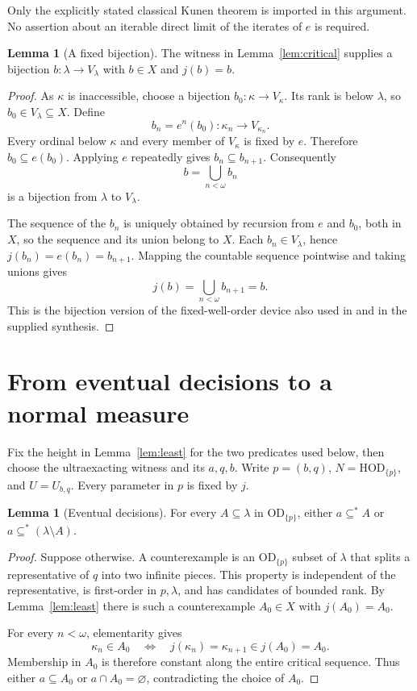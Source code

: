 \documentclass[11pt,letterpaper]{article}
\theoremstyle{definition}
\newtheorem{lemma}[definition]{Lemma}
\numberwithin{equation}{section}
\newcommand{\HOD}{\mathrm{HOD}}
\newcommand{\OD}{\mathrm{OD}}
\newcommand{\ODp}{\OD_{\{p\}}}
\newcommand{\HODp}{\HOD_{\{p\}}}
\begin{document}
Only the explicitly stated classical Kunen theorem is imported in this
argument. No assertion about an iterable direct limit of the iterates
of $e$ is required.

\begin{lemma}[A fixed bijection]\label{lem:fixed-b}
The witness in Lemma~\ref{lem:critical} supplies a bijection
$b:\lambda\to V_\lambda$ with $b\in X$ and $j(b)=b$.
\end{lemma}

\begin{proof}
As $\kappa$ is inaccessible, choose a bijection
$b_0:\kappa\to V_\kappa$. Its rank is below $\lambda$, so
$b_0\in V_\lambda\subseteq X$. Define
\[
 b_n=e^n(b_0):\kappa_n\longrightarrow V_{\kappa_n}.
\]
Every ordinal below $\kappa$ and every member of $V_\kappa$ is fixed by
$e$. Therefore $b_0\subseteq e(b_0)$. Applying $e$ repeatedly gives
$b_n\subseteq b_{n+1}$. Consequently
\[
 b=\bigcup_{n<\omega} b_n
\]
is a bijection from $\lambda$ to $V_\lambda$.

The sequence of the $b_n$ is uniquely obtained by recursion from $e$
and $b_0$, both in $X$, so the sequence and its union belong to $X$.
Each $b_n\in V_\lambda$, hence $j(b_n)=e(b_n)=b_{n+1}$. Mapping the
countable sequence pointwise and taking unions gives
\[
 j(b)=\bigcup_{n<\omega} b_{n+1}=b.
\]
This is the bijection version of the fixed-well-order device also used
in \cite[Proposition~3.9]{abgl} and in the supplied synthesis.
\end{proof}

\section{From eventual decisions to a normal measure}\label{sec:normal}

Fix the height in Lemma~\ref{lem:least} for the two predicates used
below, then choose the ultraexacting witness and its $a,q,b$. Write
$p=(b,q)$, $N=\HODp$, and $U=U_{b,q}$. Every parameter in $p$ is fixed
by $j$.

\begin{lemma}[Eventual decisions]\label{lem:decisions}
For every $A\subseteq\lambda$ in $\ODp$, either $a\subseteq^* A$ or
$a\subseteq^*(\lambda\setminus A)$.
\end{lemma}

\begin{proof}
Suppose otherwise. A counterexample is an $\ODp$ subset of $\lambda$
that splits a representative of $q$ into two infinite pieces. This
property is independent of the representative, is first-order in
$p,\lambda$, and has candidates of bounded rank. By
Lemma~\ref{lem:least} there is such a counterexample $A_0\in X$ with
$j(A_0)=A_0$.

For every $n<\omega$, elementarity gives
\[
 \kappa_n\in A_0\quad\Longleftrightarrow\quad
 j(\kappa_n)=\kappa_{n+1}\in j(A_0)=A_0.
\]
Membership in $A_0$ is therefore constant along the entire critical
sequence. Thus either $a\subseteq A_0$ or $a\cap A_0=\varnothing$,
contradicting the choice of $A_0$.
\end{proof}
\end{document}
